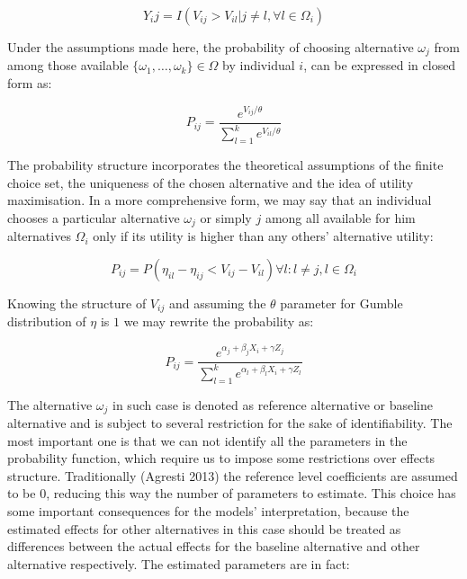 \documentclass[12pt,]{article}
\begin{document}
\begin{equation}
Y_ij = I(V_{ij} > V_{il} | j \neq l, \forall l \in \Omega_i)
\end{equation}

Under the assumptions made here, the probability of choosing alternative
\(\omega_j\) from among those available
\(\{\omega_1, \dots, \omega_k\} \in \Omega\) by individual \(i\), can be
expressed in closed form as:

\begin{equation}
P_{ij} = \frac{
    e^{V_{ij} / \theta}
}{
    \sum_{l = 1}^{k} e^{V_{il} / \theta}
}
\end{equation}

The probability structure incorporates the theoretical assumptions of
the finite choice set, the uniqueness of the chosen alternative and the
idea of utility maximisation. In a more comprehensive form, we may say
that an individual chooses a particular alternative \(\omega_j\) or
simply \(j\) among all available for him alternatives \(\Omega_i\) only
if its utility is higher than any others' alternative utility:

\begin{equation}
P_{ij} = P(\eta_{il} - \eta_{ij} < V_{ij} - V_{il}) 
    \forall l : l \neq j, l \in \Omega_i
\end{equation}

Knowing the structure of \(V_{ij}\) and assuming the \(\theta\)
parameter for Gumble distribution of \(\eta\) is \(1\) we may rewrite
the probability as:

\begin{equation}
P_{ij} = \frac{
    e^{\alpha_j + \beta_j X_i + \gamma Z_j}
}{
    \sum_{l = 1}^{k} e^{\alpha_l + \beta_l X_i + \gamma Z_l}
}
\end{equation}

The alternative \(\omega_j\) in such case is denoted as reference
alternative or baseline alternative and is subject to several
restriction for the sake of identifiability. The most important one is
that we can not identify all the parameters in the probability function,
which require us to impose some restrictions over effects structure.
Traditionally (Agresti 2013) the reference level coefficients are
assumed to be 0, reducing this way the number of parameters to estimate.
This choice has some important consequences for the models'
interpretation, because the estimated effects for other alternatives in
this case should be treated as differences between the actual effects
for the baseline alternative and other alternative respectively. The
estimated parameters are in fact:
\end{document}
